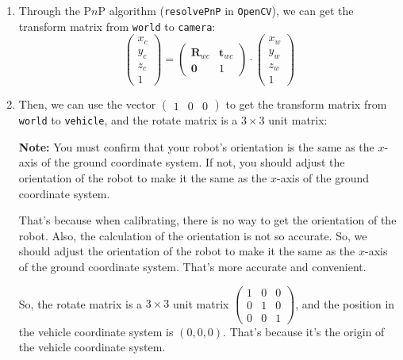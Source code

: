 \documentclass{article}
\begin{document}
\begin{enumerate}
  \item Through the P$n$P algorithm (\texttt{resolvePnP} in \texttt{OpenCV}), we can get the transform matrix from \texttt{world} to \texttt{camera}:
  \begin{equation}
    \left(
      \begin{matrix}
        x_c \\
        y_c \\
        z_c \\
        1
      \end{matrix}
    \right) = \left(\begin{matrix}\boldsymbol{R}_{wc} & \boldsymbol{t}_{wc} \\
        \boldsymbol{0} & 1\end{matrix}\right)\cdot\left(
        \begin{matrix}
          x_w \\
          y_w \\
          z_w \\
          1
        \end{matrix}
    \right)
  \end{equation}
  \item Then, we can use the vector $\left(\begin{matrix}1 & 0 & 0\end{matrix}\right)$ to get the transform matrix from \texttt{world} to \texttt{vehicle}, and the rotate matrix is a $3\times3$ unit matrix:

  \textbf{Note:} You must confirm that your robot's orientation is the same as the $x$-axis of the ground coordinate system. If not, you should adjust the orientation of the robot to make it the same as the $x$-axis of the ground coordinate system.

  That's because when calibrating, there is no way to get the orientation of the robot. Also, the calculation of the orientation is not so accurate. So, we should adjust the orientation of the robot to make it the same as the $x$-axis of the ground coordinate system. That's more accurate and convenient.

  So, the rotate matrix is a $3\times3$ unit matrix $\left(\begin{matrix}1&0&0\\0&1&0\\0&0&1\end{matrix}\right)$, and the position in the vehicle coordinate system is $\left(0,0,0\right)$. That's because it's the origin of the vehicle coordinate system.


\end{enumerate}
\end{document}
